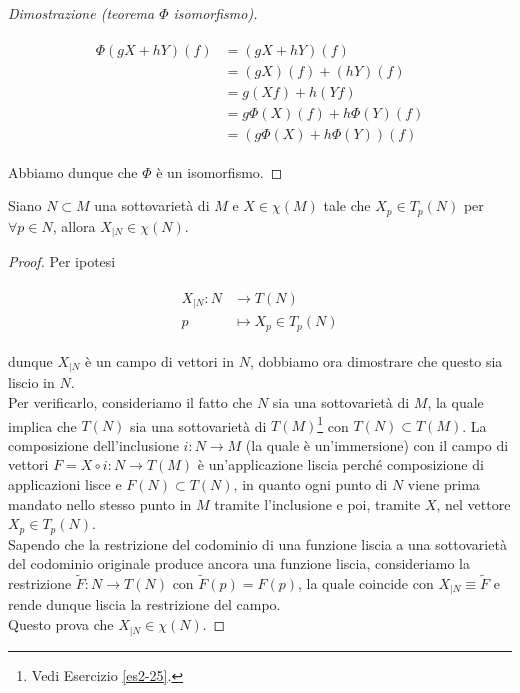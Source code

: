\begin{proof}[Dimostrazione (teorema $ \Phi $ isomorfismo)]
\begin{itemize}
	\begin{align}
		\begin{split}
			\Phi(g X + h Y)(f) &= (g X + h Y)(f)\\
			&= (g X)(f) + (h Y)(f)\\
			&= g (X f) + h (Y f)\\
			&= g \Phi(X)(f) + h \Phi(Y)(f)\\
			&= (g \Phi(X) + h \Phi(Y))(f)
		\end{split}
	\end{align}
\end{itemize}

Abbiamo dunque che $ \Phi $ è un isomorfismo.
\end{proof}

\begin{lemma}
	Siano $ N \subset M $ una sottovarietà di $ M $ e $ X \in \chi(M) $ tale che $ X_{p} \in T_{p}(N) $ per $ \forall p \in N $, allora $ X_{|N} \in \chi(N) $.
\end{lemma}

\begin{proof}
	Per ipotesi
	
	\begin{align}
		\begin{split}
			X_{|N} : N &\to T(N)\\
			p &\mapsto X_{p} \in T_{p}(N)
		\end{split}
	\end{align}
	
	dunque $ X_{|N} $ è un campo di vettori in $ N $, dobbiamo ora dimostrare che questo sia liscio in $ N $.\\
	Per verificarlo, consideriamo il fatto che $ N $ sia una sottovarietà di $ M $, la quale implica che $ T(N) $ sia una sottovarietà di $ T(M) $\footnote{%
		Vedi Esercizio \ref{es2-25}.%
	} con $ T(N) \subset T(M) $. La composizione dell'inclusione $ i : N \to M $ (la quale è un'immersione) con il campo di vettori $ F = X \circ i : N \to T(M) $ è un'applicazione liscia perché composizione di applicazioni lisce e $ F(N) \subset T(N) $, in quanto ogni punto di $ N $ viene prima mandato nello stesso punto in $ M $ tramite l'inclusione e poi, tramite $ X $, nel vettore $ X_{p} \in T_{p}(N) $.\\
	Sapendo che la restrizione del codominio di una funzione liscia a una sottovarietà del codominio originale produce ancora una funzione liscia, consideriamo la restrizione $ \tilde{F} : N \to T(N) $ con $ \tilde{F}(p) = F(p) $, la quale coincide con $ X_{|N} \equiv \tilde{F} $ e rende dunque liscia la restrizione del campo.\\
	Questo prova che $ X_{|N} \in \chi(N) $.
\end{proof}

